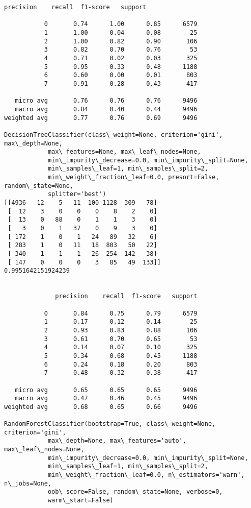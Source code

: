 \documentclass[11pt]{article}
\begin{document}
\begin{Verbatim}[commandchars=\\\{\}]
              precision    recall  f1-score   support

           0       0.74      1.00      0.85      6579
           1       1.00      0.04      0.08        25
           2       1.00      0.82      0.90       106
           3       0.82      0.70      0.76        53
           4       0.71      0.02      0.03       325
           5       0.95      0.33      0.48      1188
           6       0.60      0.00      0.01       803
           7       0.91      0.28      0.43       417

   micro avg       0.76      0.76      0.76      9496
   macro avg       0.84      0.40      0.44      9496
weighted avg       0.77      0.76      0.69      9496

DecisionTreeClassifier(class\_weight=None, criterion='gini', max\_depth=None,
            max\_features=None, max\_leaf\_nodes=None,
            min\_impurity\_decrease=0.0, min\_impurity\_split=None,
            min\_samples\_leaf=1, min\_samples\_split=2,
            min\_weight\_fraction\_leaf=0.0, presort=False, random\_state=None,
            splitter='best')
[[4936   12    5   11  100 1128  309   78]
 [  12    3    0    0    0    8    2    0]
 [  13    0   88    0    1    1    3    0]
 [   3    0    1   37    0    9    3    0]
 [ 172    1    0    1   24   89   32    6]
 [ 283    1    0   11   18  803   50   22]
 [ 340    1    1    1   26  254  142   38]
 [ 147    0    0    0    3   85   49  133]]
0.9951642151924239


              precision    recall  f1-score   support

           0       0.84      0.75      0.79      6579
           1       0.17      0.12      0.14        25
           2       0.93      0.83      0.88       106
           3       0.61      0.70      0.65        53
           4       0.14      0.07      0.10       325
           5       0.34      0.68      0.45      1188
           6       0.24      0.18      0.20       803
           7       0.48      0.32      0.38       417

   micro avg       0.65      0.65      0.65      9496
   macro avg       0.47      0.46      0.45      9496
weighted avg       0.68      0.65      0.66      9496

RandomForestClassifier(bootstrap=True, class\_weight=None, criterion='gini',
            max\_depth=None, max\_features='auto', max\_leaf\_nodes=None,
            min\_impurity\_decrease=0.0, min\_impurity\_split=None,
            min\_samples\_leaf=1, min\_samples\_split=2,
            min\_weight\_fraction\_leaf=0.0, n\_estimators='warn', n\_jobs=None,
            oob\_score=False, random\_state=None, verbose=0,
            warm\_start=False)

    \end{Verbatim}
\end{document}
